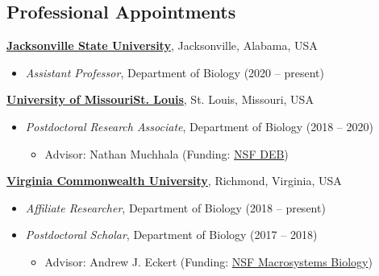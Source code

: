 \documentclass[margin,line]{res}
\begin{document}
\begin{resume}

\section{\sc Professional Appointments}
{\bf \href{http://www.jsu.edu/}{Jacksonville State University}}, Jacksonville, Alabama, USA\\
\vspace*{-.1in}
\begin{itemize}
\item[] \hspace*{-2mm} \textit{Assistant Professor}, Department of Biology  (2020 -- present)
\end{itemize}
\vspace*{-.1in}
{\bf \href{http://www.umsl.edu/}{University of Missouri\textendash St. Louis}}, St. Louis, Missouri, USA\\
\vspace*{-.1in}
\begin{itemize}
\item[] \hspace*{-2mm} \textit{Postdoctoral Research Associate}, Department of Biology  (2018 -- 2020)
\begin{itemize}
\item Advisor: Nathan Muchhala (Funding: \href{https://www.nsf.gov/awardsearch/showAward?AWD_ID=1754802&HistoricalAwards=false}{NSF DEB})
\end{itemize}
\end{itemize}
\vspace*{-.1in}
{\bf \href{https://www.vcu.edu/}{Virginia Commonwealth University}}, Richmond, Virginia, USA\\
\vspace*{-.1in}
\begin{itemize}
\item[] \hspace*{-2mm} \textit{Affiliate Researcher}, Department of Biology  (2018 -- present)
\item[] \hspace*{-2mm} \textit{Postdoctoral Scholar}, Department of Biology  (2017 -- 2018)
\begin{itemize}
	\item Advisor: Andrew J. Eckert (Funding: \href{https://www.nsf.gov/funding/pgm_summ.jsp?pims_id=503425}{NSF Macrosystems Biology})
\end{itemize}
\end{itemize}

\end{resume}
\end{document}
